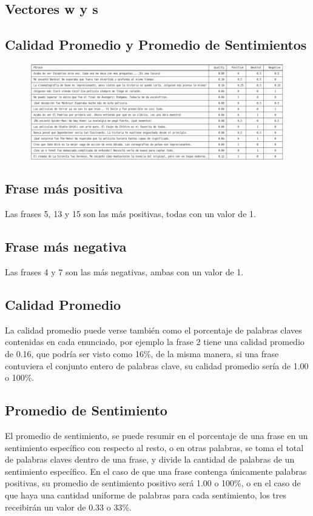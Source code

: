 \documentclass{article}
\begin{document}
\subsection{Vectores w y s}


\subsection{Calidad Promedio y Promedio de Sentimientos}
 \begin{figure}[H]
    \centering
    \includegraphics[width=1\linewidth]{Promedios.png}
\end{figure}


\subsection{Frase más positiva}
Las frases 5, 13 y 15 son las más positivas, todas con un valor de 1.

\subsection{Frase más negativa}
Las frases 4 y 7 son las más negativas, ambas con un valor de 1.

\subsection{Calidad Promedio}
La calidad promedio puede verse también como el porcentaje de palabras claves contenidas en cada enunciado, por ejemplo la frase 2 tiene una calidad promedio de 0.16, que podría ser visto como 16\%, de la misma manera, si una frase contuviera el conjunto entero de palabras clave, su calidad promedio sería de 1.00 o 100\%.

\subsection{Promedio de Sentimiento}
El promedio de sentimiento, se puede resumir en el porcentaje de una frase en un sentimiento específico con respecto al resto, o en otras palabras, se toma el total de palabras claves dentro de una frase, y divide la cantidad de palabras de un sentimiento específico. En el caso de que una frase contenga únicamente palabras positivas, su promedio de sentimiento positivo será 1.00 o 100\%, o en el caso de que haya una cantidad uniforme de palabras para cada sentimiento, los tres receibirán un valor de 0.33 o 33\%.
\end{document}
